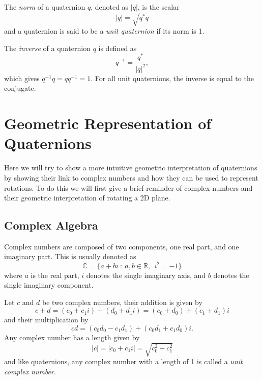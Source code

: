 The \textit{norm} of a quaternion $q$, denoted as $|q|$, is the scalar
\begin{equation*}
|q| = \sqrt{q^*q}
\end{equation*}
and a quaternion is said to be a \textit{unit quaternion} if its norm is 1.

The \textit{inverse} of a quaternion $q$ is defined as 
\begin{equation*}
q^{-1} = \frac{q^*}{|q|^2},
\end{equation*}
which gives $q^{-1}q = qq^{-1} = 1.$
For all unit quaternions, the inverse is equal to the conjugate.


\section{Geometric Representation of Quaternions}
Here we will try to show a more intuitive geometric interpretation of quaternions by showing their link to complex numbers and how they can be used to represent rotations.
To do this we will first give a brief reminder of complex numbers and their geometric interpretation of rotating a 2D plane.

\subsection{Complex Algebra}
Complex numbers are composed of two components, one real part, and one imaginary part.
This is usually denoted as
\begin{equation}
\mathbb{C} = \{a + bi~:~a,b \in \mathbb{R}, ~~i^2=-1\}
\label{eq:complexalgebra}
\end{equation}
where $a$ is the real part, $i$ denotes the single imaginary axis, and $b$ denotes the single imaginary component.

Let $c$ and $d$ be two complex numbers, their addition is given by
\begin{equation}
c + d = (c_0 + c_1i) + (d_0 + d_1i) = (c_0+d_0) + (c_1+d_1)i
\label{eq:complexaddition}
\end{equation}
and their multiplication by
\begin{equation}
cd = (c_0d_0 - c_1d_1) + (c_0d_1 + c_1d_0)i.
\label{eq:complexmult}
\end{equation}
Any complex number has a length given by
\begin{equation}
|c| = |c_0+c_1i| = \sqrt{c_0^2 + c_1^2}
\label{eq:complexlength}
\end{equation}
and like quaternions, any complex number with a length of 1 is called a \textit{unit complex number}.


